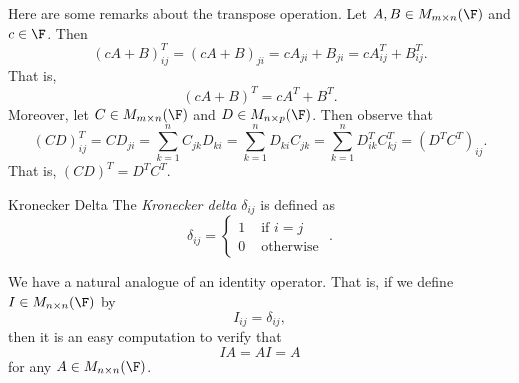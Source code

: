\documentclass[linearalgebraI]{subfiles}
\begin{document}
    \begin{remark}
        Here are some remarks about the transpose operation. Let $A, B\in M_{m\times n}(\F)$ and $c\in\F$. Then
        \begin{equation*}
            \left( cA+B \right) ^{T} _{ij} = \left( cA+B \right) _{ji} = cA_{ji}+B_{ji} = cA^{T} _{ij}+B^{T} _{ij}. 
        \end{equation*}
        That is,
        \begin{equation*}
            \left( cA+B \right) ^{T} = cA^{T} + B^{T} .
        \end{equation*}
        Moreover, let $C\in M_{m\times n}(\F)$ and $D\in M_{n\times p}(\F)$. Then observe that
        \begin{equation*}
            \left( CD \right) ^{T} _{ij} = CD_{ji} = \sum^{n}_{k=1} C_{jk}D_{ki} = \sum^{n}_{k=1} D_{ki}C_{jk} = \sum^{n}_{k=1} D^{T} _{ik}C^{T} _{kj} = \left( D^{T} C^{T}  \right) _{ij}.
        \end{equation*}
        That is, $\left( CD \right) ^{T} = D^{T} C^{T}$.
    \end{remark}

    \begin{definition}{Kronecker Delta}{}
        The \emph{Kronecker delta} $\delta_{ij}$ is defined as
        \begin{equation*}
            \delta_{ij} = \begin{cases} 1 &\text{ if } i=j \\ 0 &\text{ otherwise } \end{cases}.
        \end{equation*}
    \end{definition}

    \begin{remark}
        We have a natural analogue of an identity operator. That is, if we define $I\in M_{n\times n}(\F)$ by
        \begin{equation*}
            I_{ij} = \delta_{ij},
        \end{equation*}
        then it is an easy computation to verify that
        \begin{equation*}
            IA = AI = A
        \end{equation*}
        for any $A\in M_{n\times n}(\F)$.
    \end{remark}
\end{document}
